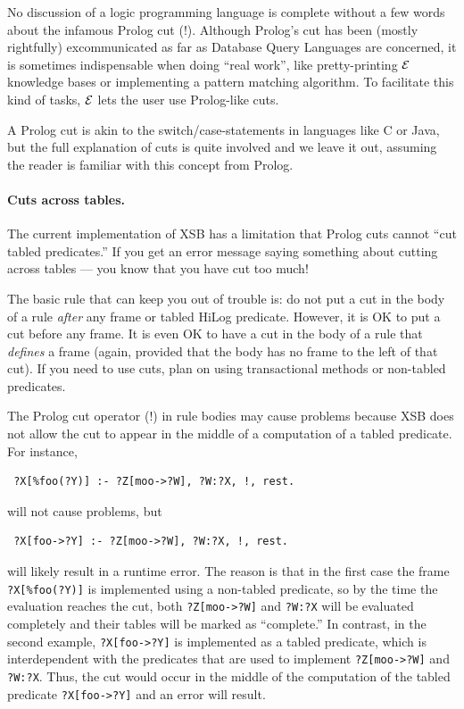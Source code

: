 \documentclass[11pt]{article}
\newcommand{\ERGO}{\mbox{\ensuremath{\cal{E}}\smaller{{\sc{RGO}}}}\xspace}
\newcommand{\FLSYSTEM}{\ERGO}
\begin{document}
\index{cut ("!) !in \FLSYSTEM}
No discussion of a logic programming language is complete without a few
words about the infamous Prolog cut (!). Although Prolog's cut has been
(mostly rightfully) excommunicated as far as Database Query Languages are
concerned, it is sometimes indispensable when doing ``real work'', like
pretty-printing \FLSYSTEM knowledge bases or implementing a pattern matching
algorithm.  To facilitate this kind of tasks, \FLSYSTEM lets the user
use Prolog-like cuts. 

A Prolog cut is akin to the switch/case-statements in languages
like C or Java, but the full explanation of cuts is quite involved
and we leave it out, assuming the reader is familiar with this concept from
Prolog.

\paragraph{Cuts across tables.}
The current implementation of XSB has a limitation that
Prolog cuts cannot ``cut tabled predicates.''  If you get an error
message saying something about cutting across tables --- you know that
you have cut too much!

The basic rule that can keep you out of trouble is: do not put a cut in the
body of a rule \emph{after} any frame or tabled  HiLog
predicate. However, it is OK to put a cut before any frame. It is
even OK to have a cut in the body of a rule that \emph{defines} a
frame (again, provided that the body has no frame to the left of
that cut). If you need to use cuts, plan on using transactional methods or
non-tabled predicates.

The Prolog cut operator (!) in rule bodies may cause problems because
XSB does not allow the cut to appear in the middle of a computation of a
tabled predicate. For instance,
\begin{verbatim}
 ?X[%foo(?Y)] :- ?Z[moo->?W], ?W:?X, !, rest.  
\end{verbatim}
will not cause problems, but
\begin{verbatim}
 ?X[foo->?Y] :- ?Z[moo->?W], ?W:?X, !, rest.  
\end{verbatim}
will likely result in a runtime error. The reason is that in the first case
the frame \verb|?X[%foo(?Y)]| is implemented using a non-tabled predicate, so
by the time the evaluation reaches the cut, both \verb|?Z[moo->?W]| and 
{\tt ?W:?X} will be evaluated completely and their tables will be marked as
``complete.'' In contrast, in the second example, \verb|?X[foo->?Y]| is
implemented as a tabled predicate, which is interdependent with the
predicates that are used to implement \verb|?Z[moo->?W]| and 
{\tt ?W:?X}. Thus, the cut would occur in the middle of the computation of
the tabled predicate \verb|?X[foo->?Y]| and an error will result.
\end{document}
